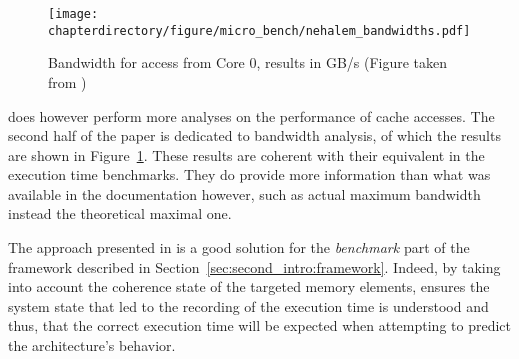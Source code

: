 \begin{figure}[hbt!]
\centering
\texttt{[image: \\chapterdirectory/figure/micro\_bench/nehalem\_bandwidths.pdf]}
\caption{%
Bandwidth for access from Core 0, results in GB/s (Figure
taken from \cite{10.1109/PACT.2009.22})
}
\label{fig:micro_bench:intel_nehalem_broad}
\end{figure}

\cite{10.1109/PACT.2009.22} does however perform more analyses on the
performance of cache accesses. The second half of the paper is dedicated to
bandwidth analysis, of which the results are shown in
Figure~\ref{fig:micro_bench:intel_nehalem_broad}. These results are coherent
with their equivalent in the execution time benchmarks. They do provide more
information than what was available in the documentation however, such as actual
maximum bandwidth instead the theoretical maximal one.

The approach presented in \cite{10.1109/PACT.2009.22} is a good solution for the
\textit{benchmark} part of the framework described in
Section~\ref{sec:second_intro:framework}. Indeed, by taking into account the
coherence state of the targeted memory elements, \cite{10.1109/PACT.2009.22}
ensures the system state that led to the recording of the execution time is
understood and thus, that the correct execution time will be expected when attempting
to predict the architecture's behavior.
\stopallthesefloats
